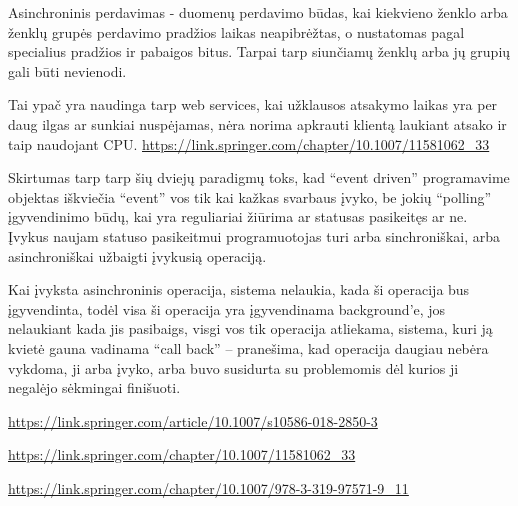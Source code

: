 \documentclass{VUMIFPSkursinis}
\begin{document}
Asinchroninis perdavimas - duomenų perdavimo būdas, kai kiekvieno ženklo arba ženklų grupės perdavimo pradžios laikas neapibrėžtas, o nustatomas pagal specialius pradžios ir pabaigos bitus.
Tarpai tarp siunčiamų ženklų arba jų grupių gali būti nevienodi.

Tai ypač yra naudinga tarp web services, kai užklausos atsakymo laikas yra per daug ilgas ar sunkiai nuspėjamas, nėra norima apkrauti klientą laukiant atsako ir taip naudojant CPU.
\url{https://link.springer.com/chapter/10.1007/11581062_33}

Skirtumas tarp tarp šių dviejų paradigmų toks, kad “event driven” programavime objektas iškviečia “event” vos tik kai kažkas svarbaus įvyko, be jokių “polling” įgyvendinimo būdų, kai yra reguliariai žiūrima ar statusas pasikeitęs ar ne. Įvykus naujam statuso pasikeitmui programuotojas turi arba sinchroniškai, arba asinchroniškai užbaigti įvykusią operaciją.

Kai įvyksta asinchroninis operacija, sistema nelaukia, kada ši operacija bus įgyvendinta, todėl visa ši operacija yra įgyvendinama background’e, jos nelaukiant kada jis pasibaigs, visgi vos tik operacija atliekama, sistema, kuri ją kvietė gauna vadinama “call back” – pranešima, kad operacija daugiau nebėra vykdoma, ji arba įvyko, arba buvo susidurta su problemomis dėl kurios ji negalėjo sėkmingai finišuoti.


\url{https://link.springer.com/article/10.1007/s10586-018-2850-3}

\url{https://link.springer.com/chapter/10.1007/11581062_33}

\url{https://link.springer.com/chapter/10.1007/978-3-319-97571-9_11}
\end{document}
